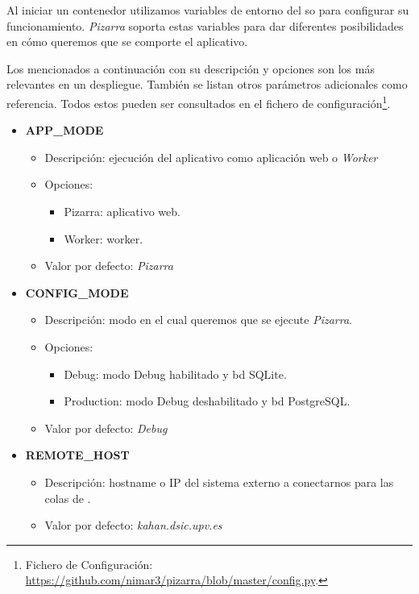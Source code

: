 \documentclass[11pt,spanish,listoffigures,listoftables]{tfgetsinf}
\begin{document}
Al iniciar un \Gls{contenedor} utilizamos variables de entorno del \acrshort{so} para configurar su funcionamiento. \textit{Pizarra} soporta estas variables para dar diferentes posibilidades en cómo queremos que se comporte el aplicativo. 

Los mencionados a continuación con su descripción y opciones son los más relevantes en un despliegue. También se listan otros parámetros adicionales como referencia. Todos estos pueden ser consultados en el fichero de configuración\footnote{Fichero de Configuración: \url{https://github.com/nimar3/pizarra/blob/master/config.py}.}.

\begin{itemize}
	\item \textbf{APP\_MODE}
	\begin{itemize}
		\item Descripción: ejecución del aplicativo como aplicación web o \textit{Worker}
		\item Opciones:
		\begin{itemize}
			\item Pizarra: aplicativo web.
			\item Worker: worker.
		\end{itemize}
		\item Valor por defecto: \textit{Pizarra}
	\end{itemize}
\end{itemize}

\begin{itemize}
	\item \textbf{CONFIG\_MODE}
	\begin{itemize}
		\item Descripción: modo en el cual queremos que se ejecute \textit{Pizarra}.
		\item Opciones:
		\begin{itemize}
			\item Debug: modo Debug habilitado y \acrshort{bd} SQLite.
			\item Production: modo Debug deshabilitado y \acrshort{bd} PostgreSQL.
		\end{itemize}
		\item Valor por defecto: \textit{Debug}
	\end{itemize}
\end{itemize}

\begin{itemize}
	\item \textbf{REMOTE\_HOST}
	\begin{itemize}
		\item Descripción: hostname o IP del sistema externo a conectarnos para las colas de \kahan.
		\item Valor por defecto: \textit{kahan.dsic.upv.es}
	\end{itemize}
\end{itemize}
\end{document}
